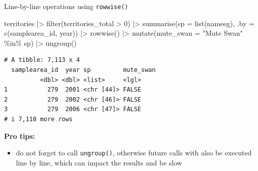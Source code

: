 \documentclass[
  ignorenonframetext,
  aspectratio=169,
]{beamer}
\newenvironment{Shaded}{\begin{snugshade}}{\end{snugshade}}
\newcommand{\AttributeTok}[1]{\textcolor[rgb]{0.40,0.45,0.13}{#1}}
\newcommand{\DecValTok}[1]{\textcolor[rgb]{0.68,0.00,0.00}{#1}}
\newcommand{\FunctionTok}[1]{\textcolor[rgb]{0.28,0.35,0.67}{#1}}
\newcommand{\NormalTok}[1]{\textcolor[rgb]{0.00,0.23,0.31}{#1}}
\newcommand{\SpecialCharTok}[1]{\textcolor[rgb]{0.37,0.37,0.37}{#1}}
\newcommand{\StringTok}[1]{\textcolor[rgb]{0.13,0.47,0.30}{#1}}
\providecommand{\tightlist}{%
  \setlength{\itemsep}{0pt}\setlength{\parskip}{0pt}}
\let\oldtexttt\texttt
\renewcommand{\texttt}[1]{\colorbox{gray!20}{\oldtexttt{#1}}}
\begin{document}
\begin{frame}[fragile]{Line-by-line operations using \texttt{rowwise()}}
\protect{}\label{line-by-line-operations-using-rowwise}
\footnotesize

\begin{Shaded}
\begin{Highlighting}[]
\NormalTok{territories }\SpecialCharTok{|\textgreater{}} 
    \FunctionTok{filter}\NormalTok{(territories\_total }\SpecialCharTok{\textgreater{}} \DecValTok{0}\NormalTok{) }\SpecialCharTok{|\textgreater{}} 
    \FunctionTok{summarise}\NormalTok{(}\AttributeTok{sp =} \FunctionTok{list}\NormalTok{(nameeg), }\AttributeTok{.by =} \FunctionTok{c}\NormalTok{(samplearea\_id, year)) }\SpecialCharTok{|\textgreater{}} 
    \FunctionTok{rowwise}\NormalTok{() }\SpecialCharTok{|\textgreater{}} 
    \FunctionTok{mutate}\NormalTok{(}\AttributeTok{mute\_swan =} \StringTok{"Mute Swan"} \SpecialCharTok{\%in\%}\NormalTok{ sp) }\SpecialCharTok{|\textgreater{}} 
    \FunctionTok{ungroup}\NormalTok{()}
\end{Highlighting}
\end{Shaded}

\begin{verbatim}
# A tibble: 7,113 x 4
  samplearea_id  year sp         mute_swan
          <dbl> <dbl> <list>     <lgl>    
1           279  2001 <chr [44]> FALSE    
2           279  2002 <chr [46]> FALSE    
3           279  2006 <chr [47]> FALSE    
# i 7,110 more rows
\end{verbatim}

\normalsize

\pause

\textbf{Pro tips:}

\begin{itemize}
\tightlist
\item
  do not forget to call \texttt{ungroup()}, otherwise future calls with
  also be executed line by line, which can impact the results and be
  slow
\end{itemize}
\end{frame}
\end{document}
